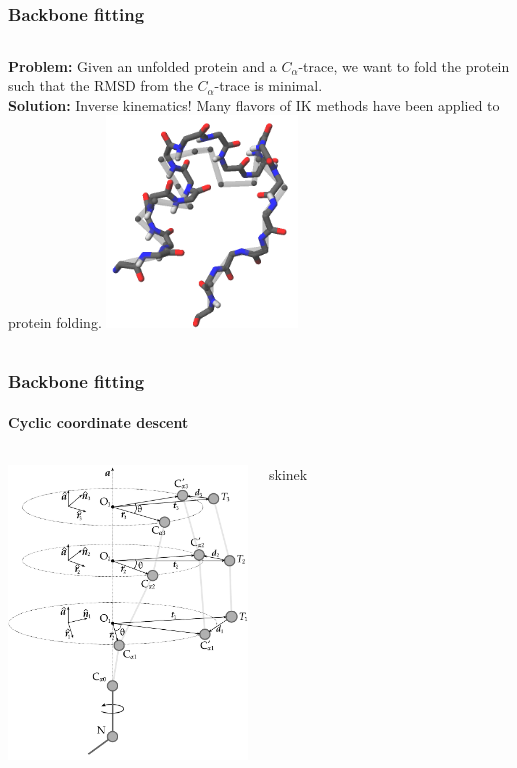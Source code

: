 \documentclass{beamer}
\begin{document}
\subsection*{}
\begin{frame}[t, fragile]
  \frametitle{Backbone fitting} 
\begin{columns}[c]
\column{2.3in}
\textbf{Problem:} Given an unfolded protein and a $C_\alpha$-trace, we want to fold the protein such that the RMSD from the $C_\alpha$-trace is minimal.
\\\vspace*{2mm}
\textbf{Solution:} Inverse kinematics! Many flavors of IK methods have been applied to protein folding.
\column{2in}
	\vspace*{4mm}
	\includegraphics[width=2in]{../rapport/figures/forside.png}
\end{columns}
\end{frame}

\begin{frame}[t, fragile]
\frametitle{Backbone fitting} 
\framesubtitle{Cyclic coordinate descent}
\begin{columns}[c]
\column{3in}
\begin{center}
\vspace*{-6mm}
\includegraphics[width=2.5in]{ccd}
\end{center}
\column{2.0in}
skinek
\end{columns}
\end{frame}
\end{document}
